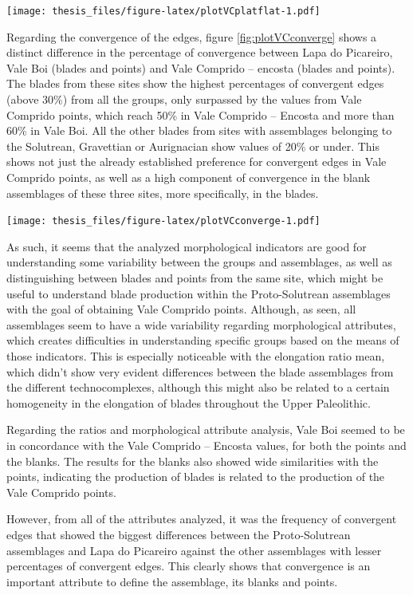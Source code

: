 \documentclass[12pt,twoside]{reedthesis}
\begin{document}
\texttt{[image: thesis\_files/figure-latex/plotVCplatflat-1.pdf]}

Regarding the convergence of the edges, figure \ref{fig:plotVCconverge} shows a distinct difference in the percentage of convergence between Lapa do Picareiro, Vale Boi (blades and points) and Vale Comprido -- encosta (blades and points). The blades from these sites show the highest percentages of convergent edges (above 30\%) from all the groups, only surpassed by the values from Vale Comprido points, which reach 50\% in Vale Comprido -- Encosta and more than 60\% in Vale Boi. All the other blades from sites with assemblages belonging to the Solutrean, Gravettian or Aurignacian show values of 20\% or under. This shows not just the already established preference for convergent edges in Vale Comprido points, as well as a high component of convergence in the blank assemblages of these three sites, more specifically, in the blades.

\texttt{[image: thesis\_files/figure-latex/plotVCconverge-1.pdf]}

As such, it seems that the analyzed morphological indicators are good for understanding some variability between the groups and assemblages, as well as distinguishing between blades and points from the same site, which might be useful to understand blade production within the Proto-Solutrean assemblages with the goal of obtaining Vale Comprido points. Although, as seen, all assemblages seem to have a wide variability regarding morphological attributes, which creates difficulties in understanding specific groups based on the means of those indicators. This is especially noticeable with the elongation ratio mean, which didn't show very evident differences between the blade assemblages from the different technocomplexes, although this might also be related to a certain homogeneity in the elongation of blades throughout the Upper Paleolithic.

Regarding the ratios and morphological attribute analysis, Vale Boi seemed to be in concordance with the Vale Comprido -- Encosta values, for both the points and the blanks. The results for the blanks also showed wide similarities with the points, indicating the production of blades is related to the production of the Vale Comprido points.

However, from all of the attributes analyzed, it was the frequency of convergent edges that showed the biggest differences between the Proto-Solutrean assemblages and Lapa do Picareiro against the other assemblages with lesser percentages of convergent edges. This clearly shows that convergence is an important attribute to define the assemblage, its blanks and points.
\end{document}
